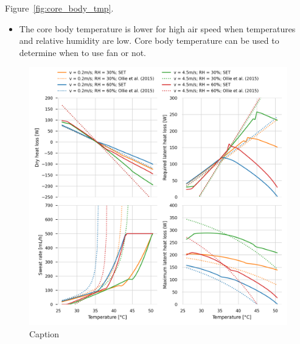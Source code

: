 Figure~\ref{fig:core_body_tmp}.

\begin{itemize}
    \item The core body temperature is lower for high air speed when temperatures and relative humidity are low.
    Core body temperature can be used to determine when to use fan or not.
\end{itemize}

\begin{figure}
    \centering
    \includegraphics[width=\textwidth]{figures/comparison_models_v2.png}
    \caption{Caption}
    \label{fig:comparison_models}
\end{figure}

